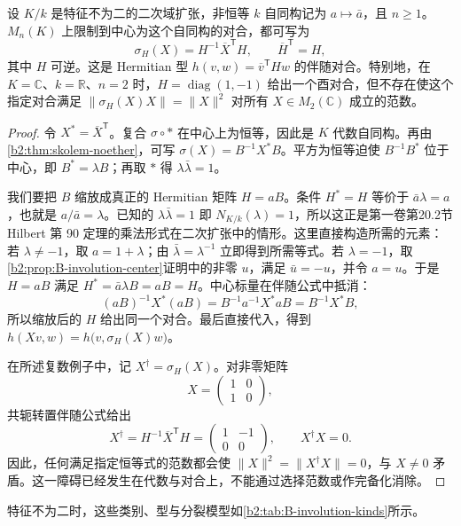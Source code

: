 \begin{proposition}\label{b2:prop:B-unitary-adjoint}
	设 \(K/k\) 是特征不为二的二次域扩张，非恒等 \(k\) 自同构记为 \(a\mapsto\bar a\)，且 \(n\ge1\)。\(M_n(K)\) 上限制到中心为这个自同构的对合，都可写为
	\[
		\sigma_H(X)=H^{-1}\overline X^{\mathsf T}H, \qquad \overline H^{\mathsf T}=H,
	\]
	其中 \(H\) 可逆。这是 Hermitian 型 \(h(v,w)=\overline v^{\mathsf T}Hw\) 的伴随对合。特别地，在 \(K=\mathbb C\)、\(k=\mathbb R\)、\(n=2\) 时，\(H=\operatorname{diag}(1,-1)\) 给出一个酉对合，但不存在使这个指定对合满足 \(\|\sigma_H(X)X\|=\|X\|^2\) 对所有 \(X\in M_2(\mathbb C)\) 成立的范数。
\end{proposition}
\begin{proof}
	令 \(X^*=\overline X^{\mathsf T}\)。复合 \(\sigma\circ *\) 在中心上为恒等，因此是 \(K\) 代数自同构。再由\cref{b2:thm:skolem-noether}，可写 \(\sigma(X)=B^{-1}X^*B\)。平方为恒等迫使 \(B^{-1}B^*\) 位于中心，即 \(B^*=\lambda B\)；再取 \(*\) 得 \(\lambda\bar\lambda=1\)。

	我们要把 \(B\) 缩放成真正的 Hermitian 矩阵 \(H=aB\)。条件 \(H^*=H\) 等价于 \(\bar a\lambda=a\)，也就是 \(a/\bar a=\lambda\)。已知的 \(\lambda\bar\lambda=1\) 即 \(N_{K/k}(\lambda)=1\)，所以这正是第一卷第20.2节 Hilbert 第 90 定理的乘法形式在二次扩张中的情形。这里直接构造所需的元素：若 \(\lambda\ne-1\)，取 \(a=1+\lambda\)；由 \(\bar\lambda=\lambda^{-1}\) 立即得到所需等式。若 \(\lambda=-1\)，取\cref{b2:prop:B-involution-center}证明中的非零 \(u\)，满足 \(\bar u=-u\)，并令 \(a=u\)。于是 \(H=aB\) 满足 \(H^*=\bar a\lambda B=aB=H\)。中心标量在伴随公式中抵消：
	\[
		(aB)^{-1}X^*(aB)=B^{-1}a^{-1}X^*aB=B^{-1}X^*B,
	\]
	所以缩放后的 \(H\) 给出同一个对合。最后直接代入，得到 \(h(Xv,w)=h\bigl(v,\sigma_H(X)w\bigr)\)。

	在所述复数例子中，记 \(X^\dagger=\sigma_H(X)\)。对非零矩阵
	\[
		X=\begin{pmatrix}1&0\\1&0\end{pmatrix},
	\]
	共轭转置伴随公式给出
	\[
		X^\dagger=H^{-1}\overline X^{\mathsf T}H
		=\begin{pmatrix}1&-1\\0&0\end{pmatrix},
		\qquad X^\dagger X=0.
	\]
	因此，任何满足指定恒等式的范数都会使 \(\|X\|^2=\|X^\dagger X\|=0\)，与 \(X\ne0\) 矛盾。这一障碍已经发生在代数与对合上，不能通过选择范数或作完备化消除。
\end{proof}

特征不为二时，这些类别、型与分裂模型如\cref{b2:tab:B-involution-kinds}所示。

